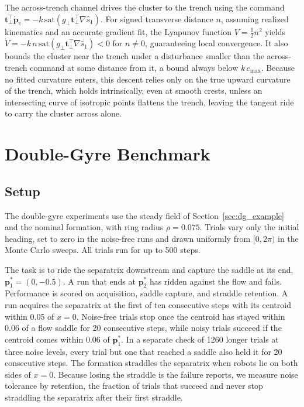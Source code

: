 \documentclass[lettersize,journal]{IEEEtran}
\begin{document}
The across-trench channel drives the cluster to the trench using the
command $\mathbf{t}_\perp^\top\dot{\mathbf{p}}_c =
-k\,\mathrm{sat}(g_\perp\mathbf{t}_\perp^\top\nabla\hat{s}_1)$. For signed
transverse distance $n$, assuming realized kinematics and an accurate
gradient fit, the Lyapunov function $V = \tfrac{1}{2}n^2$ yields
$\dot{V} = -k\,n\,\mathrm{sat}(g_\perp\mathbf{t}_\perp^\top\nabla\hat{s}_1) < 0$
for $n \neq 0$, guaranteeing local convergence. It also bounds the
cluster near the trench under a disturbance smaller than the across-trench
command at some distance from it, a bound always below $k\,c_{\max}$. Because no fitted curvature
enters, this descent relies only on the true upward curvature of the
trench, which holds intrinsically, even at smooth crests, unless an
intersecting curve of isotropic points flattens the trench, leaving the
tangent ride to carry the cluster across alone.


\section{Double-Gyre Benchmark}
\label{sec:dg_bench}

\subsection{Setup}

The double-gyre experiments use the steady field of
Section~\ref{sec:dg_example} and the nominal formation, with ring radius
$\rho = 0.075$. Trials vary only the initial heading, set to zero in the
noise-free runs and drawn uniformly from $[0, 2\pi)$ in the Monte Carlo
sweeps. All trials run for up to 500 steps.

The task is to ride the separatrix downstream and capture the saddle at
its end, $\mathbf{p}^*_1 = (0, -0.5)$. A run that ends at $\mathbf{p}^*_2$
has ridden against the flow and fails. Performance is scored on
acquisition, saddle capture, and straddle retention. A run acquires the separatrix at the first of ten consecutive
steps with its centroid within 0.05 of $x = 0$. Noise-free trials stop once
the centroid has stayed within 0.06 of a flow saddle for 20 consecutive
steps, while noisy trials succeed if the centroid comes within 0.06 of
$\mathbf{p}^*_1$. In a separate check of 1260 longer
trials at three noise levels, every trial but one that reached a saddle
also held it for 20 consecutive steps. The formation straddles the
separatrix when robots lie on both sides of $x = 0$.
Because losing the straddle is the
failure \cite{26} reports, we measure noise tolerance by retention, the
fraction of trials that succeed and never stop straddling the separatrix
after their first straddle.
\end{document}
